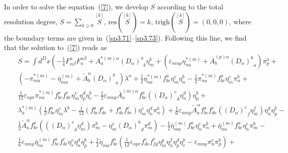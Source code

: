 \documentclass[a4paper,10pt]{article}
\begin{document}
In order to solve the equation~(\ref{7}), we develop $S$ according to the
total resolution degree, $S=\sum\nolimits_{k\geq 0}\stackrel{[k]}{S}$, $%
\mathrm{res}\left( \stackrel{[k]}{S}\right) =k$, $\mathrm{trigh}\left( 
\stackrel{[k]}{S}\right) =\left( 0,0,0\right) $, where the boundary terms
are given in~(\ref{sp3.71}--\ref{sp3.73}). Following this line, we find that
the solution to~(\ref{7}) reads as 
\begin{eqnarray}
\label{21}
&&S=\int d^{D}x\left( -\frac{1}{4}F_{\alpha \beta }^{a}F_{a}^{\alpha \beta
}+A_{a}^{*(m)\alpha }\left( D_{\alpha }\right) _{\;\;b}^{a}\eta
_{m}^{b}+\left( \varepsilon _{mnp}\eta _{na}^{*(m)}+\bar{A}_{b}^{(p)\alpha
}\left( D_{\alpha }\right) _{\;\;a}^{b}\right) \pi _{p}^{a}+\right.  
\nonumber \\
&&\left( -\pi _{ma}^{*(m)}-\bar{\eta}_{ma}^{(m)}+\tilde{A}_{b}^{\alpha
}\left( D_{\alpha }\right) _{\;\;a}^{b}\right) \lambda ^{a}+\frac{1}{2}\eta
_{na}^{*(m)}f_{bc}^{a}\eta _{m}^{c}\eta _{n}^{b}-\frac{1}{2}\pi
_{na}^{*(m)}f_{bc}^{a}\eta _{m}^{c}\pi _{n}^{b}+  \nonumber \\
&&\frac{1}{12}\varepsilon _{npr}\pi _{na}^{*(m)}f_{bc}^{a}f_{de}^{c}\eta
_{m}^{e}\eta _{p}^{d}\eta _{r}^{b}-\frac{1}{2}\varepsilon _{mnp}\bar{A}%
_{a}^{(m)\alpha }f_{bc}^{a}\left( \left( D_{\alpha }\right) _{\;\;d}^{c}\eta
_{n}^{d}\right) \eta _{p}^{b}+  \nonumber \\
&&\lambda _{a}^{*(m)}\left( \frac{1}{2}f_{bc}^{a}\eta _{m}^{c}\lambda ^{b}-%
\frac{1}{12}\left( f_{bc}^{a}f_{de}^{c}+f_{dc}^{a}f_{be}^{c}\right) \eta
_{m}^{e}\eta _{n}^{d}\pi _{n}^{b}\right) +\frac{1}{6}\varepsilon _{mnp}%
\tilde{A}_{a}^{\alpha }f_{bc}^{a}f_{de}^{c}\left( \left( D_{\alpha }\right)
_{\;\;f}^{e}\eta _{m}^{f}\right) \eta _{n}^{d}\eta _{p}^{b}-  \nonumber \\
&&\frac{1}{2}\tilde{A}_{a}^{\alpha }f_{bc}^{a}\left( \left( \left( D_{\alpha
}\right) _{\;\;d}^{c}\eta _{m}^{d}\right) \pi _{m}^{b}-\eta _{m}^{c}\left(
D_{\alpha }\right) _{\;\;d}^{b}\pi _{m}^{d}\right) -\frac{1}{2}\bar{\eta}%
_{ma}^{(m)}f_{bc}^{a}\eta _{n}^{c}\pi _{n}^{b}+\bar{\eta}%
_{na}^{(m)}f_{bc}^{a}\eta _{n}^{c}\pi _{m}^{b}-  \nonumber \\
&&\frac{1}{6}\varepsilon _{mnp}\bar{\eta}_{ra}^{(m)}f_{bc}^{a}f_{de}^{c}\eta
_{r}^{e}\eta _{n}^{d}\eta _{p}^{b}+\frac{1}{2}\tilde{\eta}%
_{ma}f_{bc}^{a}\left( \frac{1}{12}\varepsilon _{npr}f_{de}^{c}f_{fg}^{e}\eta
_{m}^{g}\eta _{n}^{f}\eta _{p}^{d}\eta _{r}^{b}-\varepsilon _{mnp}\pi
_{n}^{c}\pi _{p}^{b}\right) +  \nonumber \\

\end{eqnarray}
\end{document}
